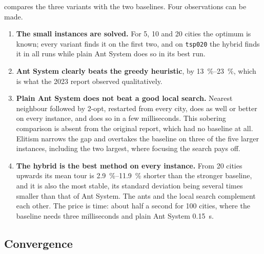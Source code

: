 \documentclass[11pt,a4paper]{article}
\newcommand{\code}[1]{\texttt{#1}}
\begin{document}
 compares the three variants with the two baselines. Four observations
can be made.

\begin{enumerate}
    \item \textbf{The small instances are solved.} For 5, 10 and 20 cities the optimum is
          known; every variant finds it on the first two, and on \code{tsp020} the hybrid finds
          it in all \ExperimentRuns{} runs while plain Ant System does so in its best run.
    \item \textbf{Ant System clearly beats the greedy heuristic}, by
          \SIrange{13}{23}{\percent}, which is what the 2023 report observed
          qualitatively.
    \item \textbf{Plain Ant System does not beat a good local search.} Nearest neighbour
          followed by 2-opt, restarted from every city, does as well or better on every instance,
          and does so in a few milliseconds. This sobering comparison is absent from the original
          report, which had no baseline at all. Elitism narrows the gap and overtakes the
          baseline on three of the five larger instances, including the two largest, where
          focusing the search pays off.
    \item \textbf{The hybrid is the best method on every instance.} From 20 cities upwards
          its mean tour is \SIrange{2.9}{11.9}{\percent} shorter than the stronger baseline, and
          it is also the most stable, its standard deviation being several times smaller than
          that of Ant System. The ants and the local search complement each other. The price is
          time: about half a second for 100 cities, where the baseline needs three milliseconds
          and plain Ant System \SI{0.15}{\second}.
\end{enumerate}

\subsection{Convergence}
\end{document}
